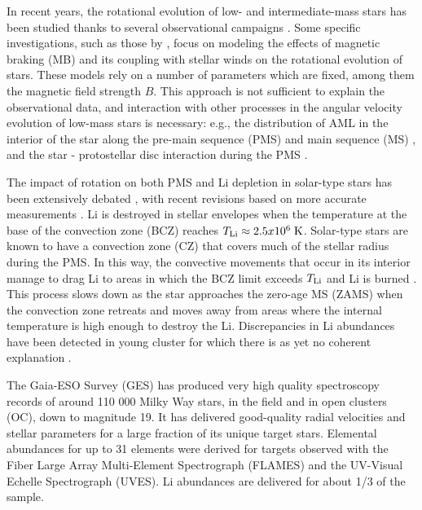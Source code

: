 \documentclass[fleqn,usenatbib]{mnras}
\begin{document}
In recent years, the rotational evolution of low- and intermediate-mass stars has been studied thanks to several observational campaigns \citep{Hartman2010, Gallet2013, Bouvier2016}. Some specific investigations, such as those by \citet{Ud-Doula2008, Cranmer2011, Gallet2015, Amard2016}, focus on modeling the effects of magnetic braking (MB) and its coupling with stellar winds on the rotational evolution of stars. These models rely on a number of parameters which are fixed, among them the magnetic field strength $B$. This approach is not sufficient to explain the observational data, and interaction with other processes in the angular velocity evolution of low-mass stars is necessary: e.g., the distribution of AML in the interior of the star along the pre-main sequence (PMS) and main sequence (MS) \citep{Charbonnel2005, Eggenberger2008, Eggenberger2009, Caballero2020}, and the star - protostellar disc interaction during the PMS \citep{Bouvier2008,Gallet2013,Eggenberger2012,Zanni2012,Bouvier2016}.\par

The impact of rotation on both PMS and Li depletion in solar-type stars has been extensively debated \citep{Pinsonneault1997,Jeffries2004,Somers2014}, with recent revisions based on more accurate measurements \citep{Gallet2013, Bouvier2016, Bouvier2018, Franciosini2022}. Li is destroyed in stellar envelopes when the temperature at the base of the convection zone (BCZ) reaches $T_{\mathrm{Li}} \approx 2.5 x 10^6\; \mathrm{K}$. Solar-type stars are known to have a convection zone (CZ) that covers much of the stellar radius during the PMS. In this way, the convective movements that occur in its interior manage to drag Li to areas in which the BCZ limit exceeds $T_{\mathrm{Li}}$ and Li is burned \citep{Iben1965}. This process slows down as the star approaches the zero-age MS (ZAMS) when the convection zone retreats and moves away from areas where the internal temperature is high enough to destroy the Li. Discrepancies in Li abundances have been detected in young cluster for which there is as yet no coherent explanation \citep[see][and references therein]{Caballero2020}.\par

The Gaia-ESO Survey (GES) \citep{Gilmore2012,Randich2013,Randich2022} has produced very high quality spectroscopy records of around 110 000 Milky Way stars, in the field and in open clusters (OC), down to magnitude 19. It has delivered good-quality radial velocities and stellar parameters for a large fraction of its unique target stars. Elemental abundances for up to 31 elements were derived for targets observed with the Fiber Large Array Multi-Element Spectrograph (FLAMES) and the UV-Visual Echelle Spectrograph (UVES). Li abundances are delivered for about 1/3 of the sample.\par
\end{document}
